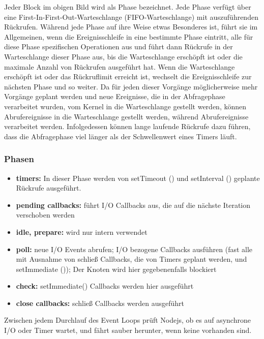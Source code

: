 Jeder Block im obigen Bild wird als Phase bezeichnet.
Jede Phase verfügt über eine First-In-First-Out-Warteschlange (FIFO-Warteschlange) mit auszuführenden Rückrufen. 
Während jede Phase auf ihre Weise etwas Besonderes ist, führt sie im Allgemeinen,
wenn die Ereignisschleife in eine bestimmte Phase eintritt, alle für diese Phase spezifischen Operationen aus und führt dann Rückrufe in der Warteschlange dieser Phase aus, 
bis die Warteschlange erschöpft ist oder die maximale Anzahl von Rückrufen ausgeführt hat. 
Wenn die Warteschlange erschöpft ist oder das Rückruflimit erreicht ist, wechselt die Ereignisschleife zur nächsten Phase und so weiter.
\newline
\newline
Da für jeden dieser Vorgänge möglicherweise mehr Vorgänge geplant werden und neue Ereignisse, 
die in der Abfragephase verarbeitet wurden, vom Kernel in die Warteschlange gestellt werden, 
können Abrufereignisse in die Warteschlange gestellt werden, während Abrufereignisse verarbeitet werden. 
Infolgedessen können lange laufende Rückrufe dazu führen, dass die Abfragephase viel länger als der Schwellenwert eines Timers läuft. 

\subsubsection{Phasen}

\begin{itemize}
    \item \textbf{timers:} In dieser Phase werden von setTimeout () und setInterval () geplante Rückrufe ausgeführt.
    \item \textbf{pending callbacks:} führt I/O Callbacks aus, die auf die nächste Iteration verschoben werden
    \item \textbf{idle, prepare:} wird nur intern verwendet
    \item \textbf{poll:} neue I/O Events abrufen; I/O bezogene Callbacks ausführen (fast alle mit Ausnahme von schließ Callbacks, die von Timers geplant werden, und setImmediate ()); Der Knoten wird hier gegebenenfalls blockiert
    \item \textbf{check:} setImmediate() Callbacks werden hier ausgeführt
    \item \textbf{close callbacks:} schließ Callbacks werden ausgeführt
\end{itemize}

Zwischen jedem Durchlauf des Event Loops prüft Nodejs, ob es auf asynchrone I/O oder Timer wartet, und fährt sauber herunter, wenn keine vorhanden sind.

